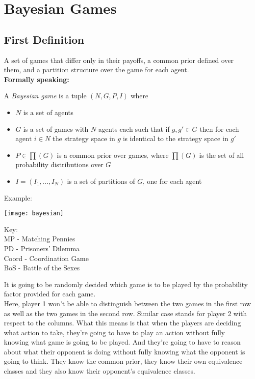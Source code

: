 \section{Bayesian Games}

\subsection{First Definition}
A set of games that differ only in their payoffs, a common prior defined over them, and a partition structure over the game for each agent.\\

\textbf{Formally speaking:}

A \textit{Bayesian game} is a tuple $(N, G, P, I)$ where
\begin{itemize}
\item $N$ is a set of agents
\item $G$ is a set of games with $N$ agents each such that if $g, g' \in G$ then for each agent $i \in N$ the strategy space in $g$ is identical to the strategy space in $g'$
\item $P \in \prod(G)$ is a common prior over games, where $\prod(G) $ is the set of all probability distributions over $G$
\item $I = (I_1, \dots , I_N) $ is a set of partitions of $G$, one for each agent
\end{itemize}

Example:\\
 \begin{center}
\texttt{[image: bayesian]}\\
\begin{flushleft}
Key:\\
MP - Matching Pennies\\
PD - Prisoners' Dilemma\\
Coord - Coordination Game\\
BoS - Battle of the Sexes
\end{flushleft}
\end{center}
It is going to be randomly decided which game is to be played by the probability factor provided for each game.\\
Here, player 1 won't be able to distinguish between the two games in the first row as well as the two games in the second row. Similar case stands for player 2 with respect to the columns. What this means is that when the players are deciding what action to take, they're going to have to play an action without fully knowing what game is going to be played. And they're going to have to reason about what their opponent is doing without fully knowing what the opponent is going to think. They know the common prior, they know their own equivalence classes and they also know their opponent's equivalence classes.

